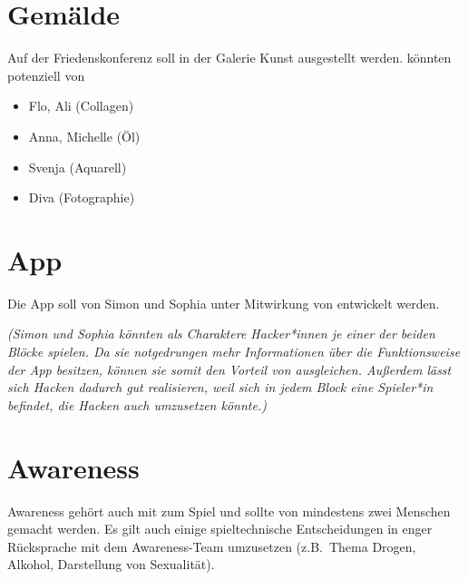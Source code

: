 \section{Gemälde} 
Auf der Friedenskonferenz soll in der Galerie Kunst ausgestellt werden.
 könnten potenziell von 
\begin{itemize} 
  \item Flo, Ali (Collagen) 
  \item Anna, Michelle (Öl)
  \item Svenja (Aquarell) 
  \item Diva (Fotographie)
\end{itemize}

\section{App} 
Die App soll von Simon und Sophia unter Mitwirkung von \creators{} entwickelt
werden.

\emph{(Simon und Sophia könnten als Charaktere Hacker*innen je einer der beiden Blöcke
spielen. Da sie notgedrungen mehr Informationen über die Funktionsweise der App
besitzen, können sie somit den Vorteil von \creators{} ausgleichen. Außerdem
lässt sich Hacken dadurch gut realisieren, weil sich in jedem Block eine
Spieler*in befindet, die Hacken auch umzusetzen könnte.)}

\section{Awareness}
Awareness gehört auch mit zum Spiel und sollte von mindestens zwei Menschen
gemacht werden. Es gilt auch einige spieltechnische Entscheidungen in enger
Rücksprache mit dem Awareness-Team umzusetzen (z.B.~Thema Drogen, Alkohol,
Darstellung von Sexualität).
